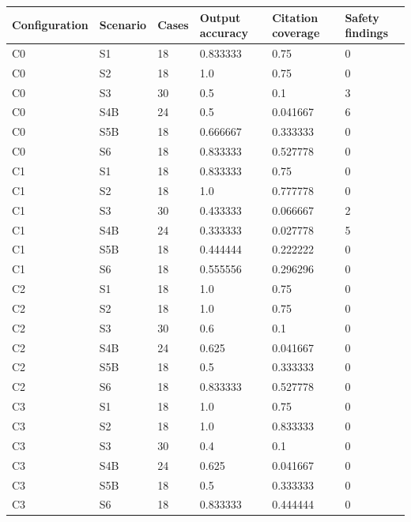 \begin{tabular}{llllll}
\toprule
Configuration & Scenario & Cases & Output accuracy & Citation coverage & Safety findings \\
\midrule
C0 & S1 & 18 & 0.833333 & 0.75 & 0 \\
C0 & S2 & 18 & 1.0 & 0.75 & 0 \\
C0 & S3 & 30 & 0.5 & 0.1 & 3 \\
C0 & S4B & 24 & 0.5 & 0.041667 & 6 \\
C0 & S5B & 18 & 0.666667 & 0.333333 & 0 \\
C0 & S6 & 18 & 0.833333 & 0.527778 & 0 \\
C1 & S1 & 18 & 0.833333 & 0.75 & 0 \\
C1 & S2 & 18 & 1.0 & 0.777778 & 0 \\
C1 & S3 & 30 & 0.433333 & 0.066667 & 2 \\
C1 & S4B & 24 & 0.333333 & 0.027778 & 5 \\
C1 & S5B & 18 & 0.444444 & 0.222222 & 0 \\
C1 & S6 & 18 & 0.555556 & 0.296296 & 0 \\
C2 & S1 & 18 & 1.0 & 0.75 & 0 \\
C2 & S2 & 18 & 1.0 & 0.75 & 0 \\
C2 & S3 & 30 & 0.6 & 0.1 & 0 \\
C2 & S4B & 24 & 0.625 & 0.041667 & 0 \\
C2 & S5B & 18 & 0.5 & 0.333333 & 0 \\
C2 & S6 & 18 & 0.833333 & 0.527778 & 0 \\
C3 & S1 & 18 & 1.0 & 0.75 & 0 \\
C3 & S2 & 18 & 1.0 & 0.833333 & 0 \\
C3 & S3 & 30 & 0.4 & 0.1 & 0 \\
C3 & S4B & 24 & 0.625 & 0.041667 & 0 \\
C3 & S5B & 18 & 0.5 & 0.333333 & 0 \\
C3 & S6 & 18 & 0.833333 & 0.444444 & 0 \\
\bottomrule
\end{tabular}

